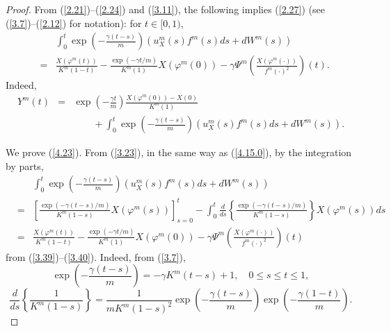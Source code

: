 \documentclass[12pt]{article}
\begin{document}
\begin{proof}
From (\ref{2.21})--(\ref{2.24}) and (\ref{3.11}), the following implies (\ref{2.27}) (see (\ref{3.7})--(\ref{2.12})
for notation): for $t\in [0,1)$,
\begin{eqnarray}
&&\int_{0}^{t}\exp\left(-\frac{\gamma (t-s)}{m}\right)(u_X^m(s)f^m(s)ds +d W^m(s))\label{4.23}\\
 &=&\frac{X(\varphi^m(t))}{K^m(1-t)}-\frac{\exp(-\gamma t/m)}{K^m(1)}X(\varphi^m(0))
-\gamma\Psi^m\left(\frac{X(\varphi^m (\cdot))}{f^m(\cdot)^2}\right)(t).\nonumber
\end{eqnarray}
Indeed,
\begin{eqnarray}
Y^m(t)&=&\exp\left(-\frac{\gamma t}{m}\right)\frac{X(\varphi^m(0))-X(0)}{K^m(1)}\label{4.19}\\
&&\qquad +\int_{0}^{t} \exp\left(-\frac{\gamma (t-s)}{m}\right)(u_X^m(s)f^m(s)ds +d W^m(s)).\nonumber
\end{eqnarray}

We prove (\ref{4.23}).
From   (\ref{3.23}), in the same way as (\ref{4.15.0}), by the integration by parts,
\begin{eqnarray}
&&\int_{0}^{t}\exp\left(-\frac{\gamma (t-s)}{m}\right)(u_X^m(s)f^m(s)ds +d W^m(s))\\%
&=&\left[\frac{\exp(-\gamma (t-s)/m)}{K^m(1-s)}X(\varphi^m(s))\right]_{s=0}^t
 -\int_{0}^{t} \frac{d}{ds}\left\{\frac{\exp(-\gamma (t-s)/m)}{K^m(1-s)}\right\}X(\varphi^m(s))ds \nonumber\\
 &=&\frac{X(\varphi^m(t))}{K^m(1-t)}-\frac{\exp(-\gamma t/m)}{K^m(1)}X(\varphi^m(0))
-\gamma\Psi^m\left(\frac{X(\varphi^m (\cdot))}{f^m(\cdot)^2}\right)(t)\nonumber
\end{eqnarray}
from (\ref{3.39})--(\ref{3.40}).
Indeed, from (\ref{3.7}),
$$\exp\left(-\frac{\gamma (t-s)}{m}\right)=-\gamma K^m(t-s)+1,\quad 0\le s\le t\le 1,$$
$$\frac{d}{ds}\left\{\frac{1}{K^m(1-s)}\right\}=\frac{1}{mK^m(1-s)^2}
\exp\left(-\frac{\gamma (t-s)}{m}\right)\exp\left(-\frac{\gamma (1-t)}{m}\right).
$$

\end{proof}
\end{document}
